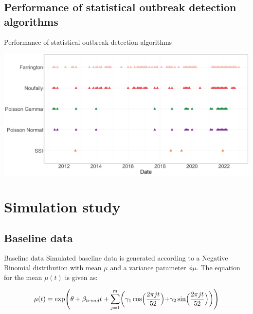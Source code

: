 \documentclass[aspectratio=169]{beamer}
\begin{document}
\hypertarget{performance-of-statistical-outbreak-detection-algorithms}{%
\subsection{Performance of statistical outbreak detection
algorithms}\label{performance-of-statistical-outbreak-detection-algorithms}}

\begin{frame}{Performance of statistical outbreak detection algorithms}
\tiny

\includegraphics[width=1\linewidth]{../figures/Compare_alarms_STEC}

\normalsize
\end{frame}

\hypertarget{simulation-study}{%
\section{Simulation study}\label{simulation-study}}

\hypertarget{baseline-data}{%
\subsection{Baseline data}\label{baseline-data}}

\begin{frame}{Baseline data}
Simulated baseline data is generated according to a Negative Binomial
distribution with mean \(\mu\) and a variance parameter \(\phi\mu\). The
equation for the mean \(\mu(t)\) is given as:

\begin{equation}
\mu(t)=\exp\Biggl(\theta+\beta_{trend} t+\sum_{j=1}^m \biggl(\gamma_1 \cos\Bigl(\frac{2\pi jt}{52}\Bigl) + \gamma_2 \sin \Bigl(\frac{2\pi jt}{52} \Bigl)\biggl)\Biggl)
\end{equation}
\end{frame}
\end{document}
